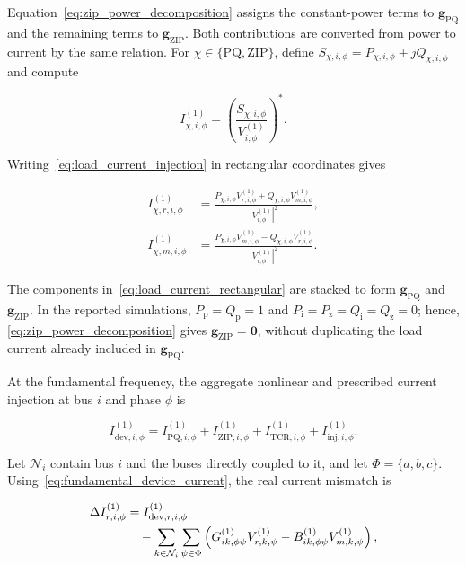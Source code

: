 \documentclass[journal]{IEEEtran}
\begin{document}
Equation~\eqref{eq:zip_power_decomposition} assigns the constant-power terms
to $\mathbf{g}_{\mathrm{PQ}}$ and the remaining terms to
$\mathbf{g}_{\mathrm{ZIP}}$. Both contributions are converted from power to
current by the same relation. For
$\chi\in\{\mathrm{PQ},\mathrm{ZIP}\}$, define
$S_{\chi,i,\phi}=P_{\chi,i,\phi}+jQ_{\chi,i,\phi}$ and compute

\begin{equation}
I_{\chi,i,\phi}^{(1)}=
\left(\frac{S_{\chi,i,\phi}}{V_{i,\phi}^{(1)}}\right)^{*}.
\label{eq:load_current_injection}
\end{equation}

Writing~\eqref{eq:load_current_injection} in rectangular coordinates gives

\begin{equation}
\begin{aligned}
I_{\chi,r,i,\phi}^{(1)}
&=\frac{P_{\chi,i,\phi}V_{r,i,\phi}^{(1)}
+Q_{\chi,i,\phi}V_{m,i,\phi}^{(1)}}
{\left|V_{i,\phi}^{(1)}\right|^{2}},\\
I_{\chi,m,i,\phi}^{(1)}
&=\frac{P_{\chi,i,\phi}V_{m,i,\phi}^{(1)}
-Q_{\chi,i,\phi}V_{r,i,\phi}^{(1)}}
{\left|V_{i,\phi}^{(1)}\right|^{2}}.
\end{aligned}
\label{eq:load_current_rectangular}
\end{equation}

The components in~\eqref{eq:load_current_rectangular} are stacked to form
$\mathbf{g}_{\mathrm{PQ}}$ and $\mathbf{g}_{\mathrm{ZIP}}$. In the reported
simulations, $P_{\mathrm{p}}=Q_{\mathrm{p}}=1$ and
$P_{\mathrm{i}}=P_{\mathrm{z}}=Q_{\mathrm{i}}=Q_{\mathrm{z}}=0$; hence,
\eqref{eq:zip_power_decomposition} gives
$\mathbf{g}_{\mathrm{ZIP}}=\mathbf{0}$, without duplicating the load current
already included in $\mathbf{g}_{\mathrm{PQ}}$.

At the fundamental frequency, the aggregate nonlinear and prescribed current
injection at bus $i$ and phase $\phi$ is

\begin{equation}
I_{\mathrm{dev},i,\phi}^{(1)}=
I_{\mathrm{PQ},i,\phi}^{(1)}+
I_{\mathrm{ZIP},i,\phi}^{(1)}+
I_{\mathrm{TCR},i,\phi}^{(1)}+
I_{\mathrm{inj},i,\phi}^{(1)}.
\label{eq:fundamental_device_current}
\end{equation}

Let $\mathcal{N}_i$ contain bus $i$ and the buses directly coupled to it, and
let $\Phi=\{a,b,c\}$. Using~\eqref{eq:fundamental_device_current}, the real
current mismatch is

\begin{align}
\Delta I_{r,i,\phi}^{(1)}
&=I_{\mathrm{dev},r,i,\phi}^{(1)}
\notag\\
&\quad-
\sum_{k\in\mathcal{N}_i}\sum_{\psi\in\Phi}
\left(
G_{ik,\phi\psi}^{(1)}V_{r,k,\psi}^{(1)}
-B_{ik,\phi\psi}^{(1)}V_{m,k,\psi}^{(1)}
\right),
\label{eq:fundamental_current_mismatch_real}
\end{align}
\end{document}

